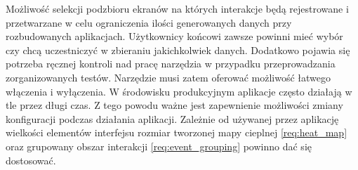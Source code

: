 \begin{enumerate}[label=\textbf{F.\arabic*}]
	 Możliwość selekcji podzbioru ekranów na których interakcje będą rejestrowane i przetwarzane w celu ograniczenia ilości generowanych danych przy rozbudowanych aplikacjach.
	 Użytkownicy końcowi zawsze powinni mieć wybór czy chcą uczestniczyć w zbieraniu jakichkolwiek danych. Dodatkowo pojawia się potrzeba ręcznej kontroli nad pracę narzędzia w przypadku przeprowadzania zorganizowanych testów. Narzędzie musi zatem oferować możliwość łatwego włączenia i wyłączenia.
	 W środowisku produkcyjnym aplikacje często działają w tle przez długi czas. Z tego powodu ważne jest zapewnienie możliwości zmiany konfiguracji podczas działania aplikacji.
	 Zależnie od używanej przez aplikację wielkości elementów interfejsu rozmiar tworzonej mapy cieplnej \ref{req:heat_map} oraz grupowany obszar interakcji \ref{req:event_grouping} powinno dać się dostosować. 
\end{enumerate}
